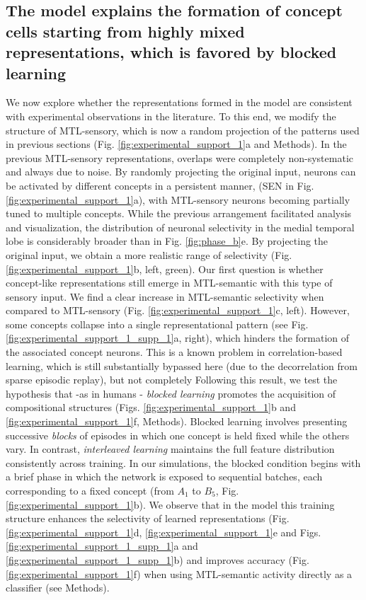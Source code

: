 \documentclass{article}
\begin{document}
\subsection*{The model explains the formation of concept cells starting from highly mixed representations, which is favored by blocked learning}
We now explore whether the representations formed in the model are consistent with experimental observations in the literature. To this end, we modify the structure of MTL-sensory, which is now a random projection of the patterns used in previous sections (Fig. \ref{fig:experimental_support_1}a and Methods). In the previous MTL-sensory representations, overlaps were completely non-systematic and always due to noise. By randomly projecting the original input, neurons can be activated by different concepts in a persistent manner, (SEN in Fig. \ref{fig:experimental_support_1}a), with MTL-sensory neurons becoming partially tuned to multiple concepts. While the previous arrangement facilitated analysis and visualization, the distribution of neuronal selectivity in the medial temporal lobe is considerably broader than in Fig. \ref{fig:phase_b}e. By projecting the original input, we obtain a more realistic range of selectivity (Fig. \ref{fig:experimental_support_1}b, left, green).
\newline\newline
Our first question is whether concept-like representations still emerge in MTL-semantic with this type of sensory input. We find a clear increase in MTL-semantic selectivity when compared to MTL-sensory (Fig. \ref{fig:experimental_support_1}c, left). However, some concepts collapse into a single representational pattern (see Fig. \ref{fig:experimental_support_1_supp_1}a, right), which hinders the formation of the associated concept neurons. This is a known problem in correlation-based learning, which is still substantially bypassed here (due to the decorrelation from sparse episodic replay), but not completely
\newline\newline
Following this result, we test the hypothesis that -as in humans - \textit{blocked learning} promotes the acquisition of compositional structures (Figs. \ref{fig:experimental_support_1}b and \ref{fig:experimental_support_1}f, Methods).  Blocked learning involves presenting successive \textit{blocks} of episodes in which one concept is held fixed while the others vary. In contrast, \textit{interleaved learning} maintains the full feature distribution consistently across training. In our simulations, the blocked condition begins with a brief phase in which the network is exposed to sequential batches, each corresponding to a fixed concept (from $A_1$ to $B_5$, Fig. \ref{fig:experimental_support_1}b). We observe that in the model this training structure enhances the selectivity of learned representations (Fig. \ref{fig:experimental_support_1}d, \ref{fig:experimental_support_1}e and Figs. \ref{fig:experimental_support_1_supp_1}a and \ref{fig:experimental_support_1_supp_1}b) and improves accuracy (Fig. \ref{fig:experimental_support_1}f) when using MTL-semantic activity directly as a classifier (see Methods). 
\end{document}
